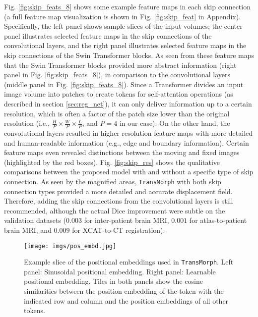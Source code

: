 \documentclass[times,twocolumn,final]{elsarticle}
\begin{document}
Fig. \ref{fig:skip_feats_8} shows some example feature maps in each skip connection (a full feature map visualization is shown in Fig. \ref{fig:skip_feat} in Appendix). Specifically, the left panel shows sample slices of the input volumes; the center panel illustrates selected feature maps in the skip connections of the convolutional layers, and the right panel illustrates selected feature maps in the skip connections of the Swin Transformer blocks. As seen from these feature maps that the Swin Transformer blocks provided more abstract information (right panel in Fig. \ref{fig:skip_feats_8}), in comparison to the convolutional layers (middle panel in Fig. \ref{fig:skip_feats_8}). Since a Transformer divides an input image volume into patches to create tokens for self-attention operations (as described in section \ref{sec:reg_net}), it can only deliver information up to a certain resolution, which is often a factor of the patch size lower than the original resolution (i.e., $\frac{H}{P}\times\frac{W}{P}\times\frac{L}{P}$, and $P=4$ in our case). On the other hand, the convolutional layers resulted in higher resolution feature maps with more detailed and human-readable information (e.g., edge and boundary information). Certain feature maps even revealed distinctions between the moving and fixed images (highlighted by the red boxes). Fig. \ref{fig:skip_res} shows the qualitative comparisons between the proposed model with and without a specific type of skip connection. As seen by the magnified areas, \texttt{TransMorph} with both skip connection types provided a more detailed and accurate displacement field. Therefore, adding the skip connections from the convolutional layers is still recommended, although the actual Dice improvement were subtle on the validation datasets ($0.003$ for inter-patient brain MRI, $0.001$ for atlas-to-patient brain MRI, and $0.009$ for XCAT-to-CT registration).
\begin{figure}[!h]
\centering
\texttt{[image: imgs/pos\_embd.jpg]}
\caption{Example slice of the positional embeddings used in \texttt{TransMorph}. Left panel: Sinusoidal positional embedding. Right panel: Learnable positional embedding. Tiles in both panels show the cosine similarities between the position embedding of the token with the indicated row and column and the position embeddings of all other tokens.\label{fig:pos_embed}}
\end{figure}
\end{document}
